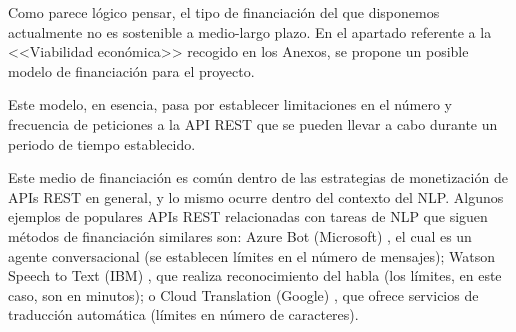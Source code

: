 Como parece lógico pensar, el tipo de financiación del que disponemos actualmente no es sostenible a medio-largo plazo. En el apartado referente a la <<Viabilidad económica>> recogido en los Anexos, se propone un posible modelo de financiación para el proyecto.

Este modelo, en esencia, pasa por establecer limitaciones en el número y frecuencia de peticiones a la API REST que se pueden llevar a cabo durante un periodo de tiempo establecido.

Este medio de financiación es común dentro de las estrategias de monetización de APIs REST en general, y lo mismo ocurre dentro del contexto del NLP. Algunos ejemplos de populares APIs REST relacionadas con tareas de NLP que siguen métodos de financiación similares son: Azure Bot (Microsoft) \cite{azure-bot}, el cual es un agente conversacional (se establecen límites en el número de mensajes); Watson Speech to Text (IBM) \cite{watson-stt}, que realiza reconocimiento del habla (los límites, en este caso, son en minutos); o Cloud Translation (Google) \cite{cloud-translation}, que ofrece servicios de traducción automática (límites en número de caracteres).